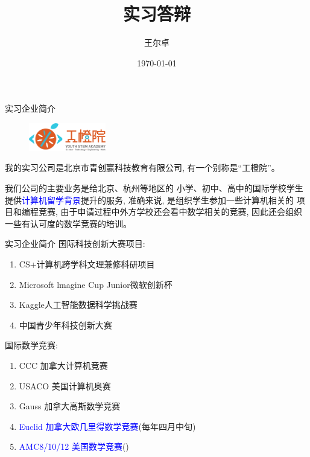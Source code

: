 \documentclass{beamer}
\title{实习答辩}
\institute{西安交通大学}
\author{王尔卓}
\date{\today}
\theoremstyle{definition}
\newcommand{\blue}[1]{\textcolor{blue}{#1}}
\newenvironment{enu}{\begin{enumerate}[(1)]}{\end{enumerate}}
\begin{document}
\begin{frame}
    \titlepage
\end{frame}
\begin{frame}{实习企业简介}
    \begin{figure}
        \centering
        \includegraphics[width=0.3\textwidth]{orange.png}
    \end{figure}
    我的实习公司是北京市青创赢科技教育有限公司, 有一个别称是“工橙院”。
    
    我们公司的主要业务是给北京、杭州等地区的
    小学、初中、高中的国际学校学生提供\blue{计算机留学背景}提升的服务, 准确来说, 是组织学生参加一些计算机相关的
    项目和编程竞赛, 由于申请过程中外方学校还会看中数学相关的竞赛, 因此还会组织一些有认可度的数学竞赛的培训。 
\end{frame}
\begin{frame}{实习企业简介}
国际科技创新大赛项目: 
\begin{enu} 
   \item CS+计算机跨学科文理兼修科研项目
   \item Microsoft lmagine Cup Junior微软创新杯
   \item Kaggle人工智能数据科学挑战赛
   \item 中国青少年科技创新大赛
\end{enu}
国际数学竞赛: 
\begin{enu}
\item CCC 加拿大计算机竞赛
\item USACO 美国计算机奥赛
\item Gauss 加拿大高斯数学竞赛
\item \blue{Euclid 加拿大欧几里得数学竞赛}(每年四月中旬)
\item \blue{AMC8/10/12 美国数学竞赛}()
\end{enu}
\end{frame}
\end{document}
